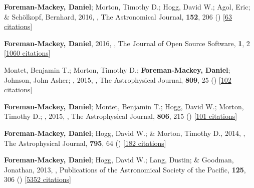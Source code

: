 \item[{\color{numcolor}\scriptsize6}] \textbf{Foreman-Mackey, Daniel}; Morton, Timothy D.; Hogg, David W.; Agol, Eric; \& Sch{\"o}lkopf, Bernhard, 2016, , The Astronomical Journal, \textbf{152}, 206 () [\href{https://ui.adsabs.harvard.edu/abs/2016AJ....152..206F}{63 citations}]

\item[{\color{numcolor}\scriptsize5}] \textbf{Foreman-Mackey, Daniel}, 2016, , The Journal of Open Source Software, \textbf{1}, 2 [\href{https://scholar.google.com/scholar?cites=1835087844145558435,17325274697099535179,14220488595059618709,12820425635803494730,7284810048757141243,17415935839493019063}{1060 citations}]

\item[{\color{numcolor}\scriptsize4}] Montet, Benjamin T.; Morton, Timothy D.; \textbf{Foreman-Mackey, Daniel}; Johnson, John Asher; \etal, 2015, , The Astrophysical Journal, \textbf{809}, 25 () [\href{https://ui.adsabs.harvard.edu/abs/2015ApJ...809...25M}{102 citations}]

\item[{\color{numcolor}\scriptsize3}] \textbf{Foreman-Mackey, Daniel}; Montet, Benjamin T.; Hogg, David W.; Morton, Timothy D.; \etal, 2015, , The Astrophysical Journal, \textbf{806}, 215 () [\href{https://ui.adsabs.harvard.edu/abs/2015ApJ...806..215F}{101 citations}]

\item[{\color{numcolor}\scriptsize2}] \textbf{Foreman-Mackey, Daniel}; Hogg, David W.; \& Morton, Timothy D., 2014, , The Astrophysical Journal, \textbf{795}, 64 () [\href{https://ui.adsabs.harvard.edu/abs/2014ApJ...795...64F}{182 citations}]

\item[{\color{numcolor}\scriptsize1}] \textbf{Foreman-Mackey, Daniel}; Hogg, David W.; Lang, Dustin; \& Goodman, Jonathan, 2013, , Publications of the Astronomical Society of the Pacific, \textbf{125}, 306 () [\href{https://ui.adsabs.harvard.edu/abs/2013PASP..125..306F}{5352 citations}]